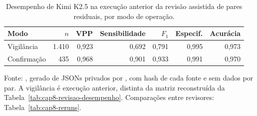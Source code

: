 \begin{table}[htbp]
\centering
\small
\caption{Desempenho de Kimi K2.5 na execução anterior da revisão assistida de pares residuais, por modo de operação.}
\label{tab:qw2-llm-comparison}
\begin{tabular}{lrrrrrr}
\toprule
Modo & $n$ & VPP & Sensibilidade & $F_1$ & Especif. & Acur\'acia \\
\midrule
Vigil\^ancia & 1.410 & 0,923 & 0,692 & 0,791 & 0,995 & 0,973 \\
Confirma\c{c}\~ao & 435 & 0,968 & 0,901 & 0,933 & 0,991 & 0,970 \\
\bottomrule
\end{tabular}
\par\smallskip\parbox{\linewidth}{\footnotesize Fonte: , gerado de JSONs privados por , com hash de cada fonte e sem dados por par. A vigilância é execução anterior, distinta da matriz reconstruída da Tabela~\ref{tab:cap8-revisao-desempenho}. Comparações entre revisores: Tabela~\ref{tab:cap8-reruns}.}
\end{table}
